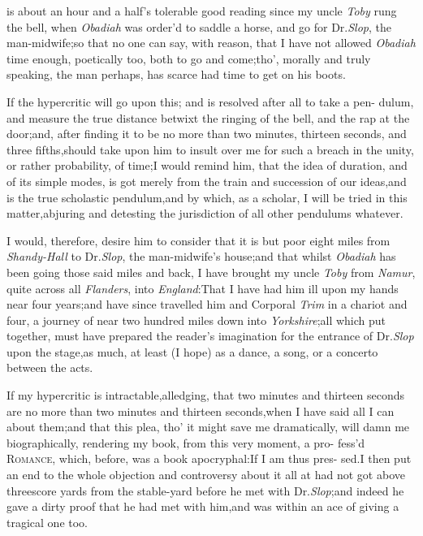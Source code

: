 \documentclass{article}
\begin{document}
 is about an hour and a
half’s tole\-rable good reading since my uncle \textit{Toby} rung
the bell, when \textit{Obadiah} was\break
order’d to saddle a horse, and go for\break 
Dr.\@ \textit{Slop}, the man-midwife;\tsk so that no one can say,
with reason, that I have not allowed \textit{Obadiah} time enough,
poetically  too, both to go
and come;\tsh tho’,\break
morally and truly speaking, the man\break
perhaps, has scarce had time to get on\break
his boots.

If the hypercritic will go upon this; and is resolved after all
to take a pen- dulum, and measure the true distance betwixt the
ringing of the bell, and the rap at the door;\tsk and, after
finding it to be no more than two minutes, thirteen seconds, and
three fifths,\tsk should take upon him to insult over me for such
a breach in the unity, or rather probability, of time;\tsk I would
remind him, that the idea of duration, and of its simple modes, is
got merely from the train and succession of our
ideas,\tsk and is the true scholastic
pendulum,\tsh and by which, as a scholar, I will be tried
in this matter,\tsk\break abjuring and detesting the jurisdiction of
all other pendulums whatever.

I would, therefore, desire him to consider that it is but poor
eight miles from \textit{Shandy-Hall} to Dr.\@ \textit{Slop}, the
man-mid\-wife’s house;\tsk and that whilst \textit{Obadiah} has
been going those said miles and back,
I have brought my uncle
\textit{Toby} from \textit{Namur}, quite across all \textit{Flanders}, into
\textit{England}:\tsk That I have had him ill upon my hands near
four years;\tsk and have since travelled him and Corporal
\textit{Trim} in a chariot and four, a journey of near two hundred
miles down into \textit{Yorkshire};\tsk all which put together,
must have prepared the reader’s imagination for the entrance
of Dr.\@ \textit{Slop} upon the stage,\tsk as much, at least (I hope)
as a dance, a song, or a concerto between the acts.

If my hypercritic is intractable,\tsk al\-ledging, that two minutes
and thirteen seconds are no more than two minutes and thirteen
seconds,\tsk when I have said all I can about them;\tsk and that this
plea, tho’ it might save me dramatically, will damn me
biographically, rendering my book, from this very moment, a
pro-
fess’d \textsc{Romance}, which, before, was a book
apocryphal:\tsk If I am thus pres-\break
sed.\tsk I then put an
end to the whole objection and controversy about it all
at\break
{}
had not got above threescore yards from the stable-yard before he met
with Dr.\@ \textit{Slop};\tsk and indeed he gave a dirty
proof that he had met with him,\tsk and was within an ace of giving a
tragical one\break
too.  
\end{document}
